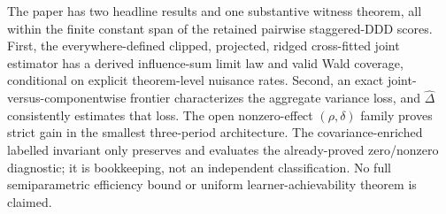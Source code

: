 The paper has two headline results and one substantive witness theorem, all within the finite constant span of the retained pairwise staggered-DDD scores. First, the everywhere-defined clipped, projected, ridged cross-fitted joint estimator has a derived influence-sum limit law and valid Wald coverage, conditional on explicit theorem-level nuisance rates. Second, an exact joint-versus-componentwise frontier characterizes the aggregate variance loss, and \(\widehat\Delta\) consistently estimates that loss. The open nonzero-effect \((\rho,\delta)\) family proves strict gain in the smallest three-period architecture. The covariance-enriched labelled invariant only preserves and evaluates the already-proved zero/nonzero diagnostic; it is bookkeeping, not an independent classification. No full semiparametric efficiency bound or uniform learner-achievability theorem is claimed.